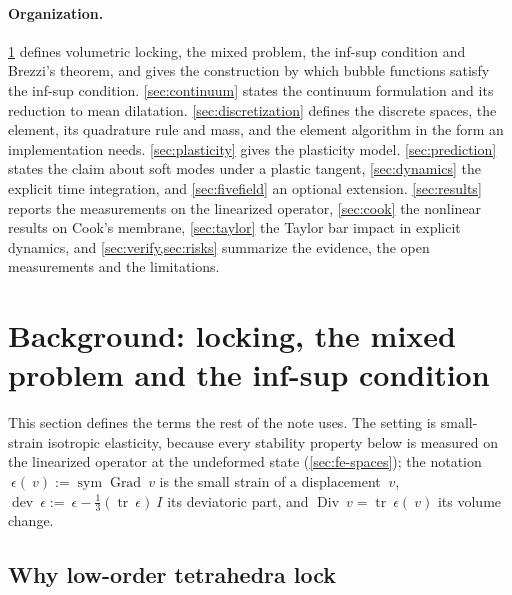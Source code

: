 \documentclass{article}
\newcommand{\Id}{~I}
\newcommand{\eps}{~\epsilon}
\newcommand{\Grad}{\operatorname{Grad}}
\newcommand{\Div}{\operatorname{Div}}
\newcommand{\dev}{\operatorname{dev}}
\newcommand{\trace}{\operatorname{tr}}
\newcommand{\sym}{\operatorname{sym}}
\theoremstyle{definition}
\theoremstyle{plain}
\begin{document}
\paragraph{Organization.} \cref{sec:background} defines volumetric locking,
the mixed problem, the inf-sup condition and Brezzi's theorem, and gives the
construction by which bubble functions satisfy the inf-sup condition.
\cref{sec:continuum} states the continuum formulation and its reduction to
mean dilatation. \cref{sec:discretization} defines the discrete spaces, the
element, its quadrature rule and mass, and the element algorithm in the form
an implementation needs. \cref{sec:plasticity} gives the plasticity model.
\cref{sec:prediction} states the claim about soft modes under a plastic
tangent, \cref{sec:dynamics} the explicit time integration, and
\cref{sec:fivefield} an optional extension. \cref{sec:results} reports the
measurements on the linearized operator, \cref{sec:cook} the nonlinear
results on Cook's membrane, \cref{sec:taylor} the Taylor bar impact in
explicit dynamics, and \cref{sec:verify,sec:risks}
summarize the evidence, the open measurements and the limitations.

\section{Background: locking, the mixed problem and the inf-sup condition}
\label{sec:background}

This section defines the terms the rest of the note uses. The setting is
small-strain isotropic elasticity, because every stability property below is
measured on the linearized operator at the undeformed state
(\cref{sec:fe-spaces}); the notation $\eps(~v) := \sym\Grad~v$ is the
small strain of a displacement $~v$, $\dev\eps := \eps - \tfrac13(\trace\eps)\Id$
its deviatoric part, and $\Div ~v = \trace\eps(~v)$ its volume change.

\subsection{Why low-order tetrahedra lock}
\label{sec:whylock}
\end{document}
